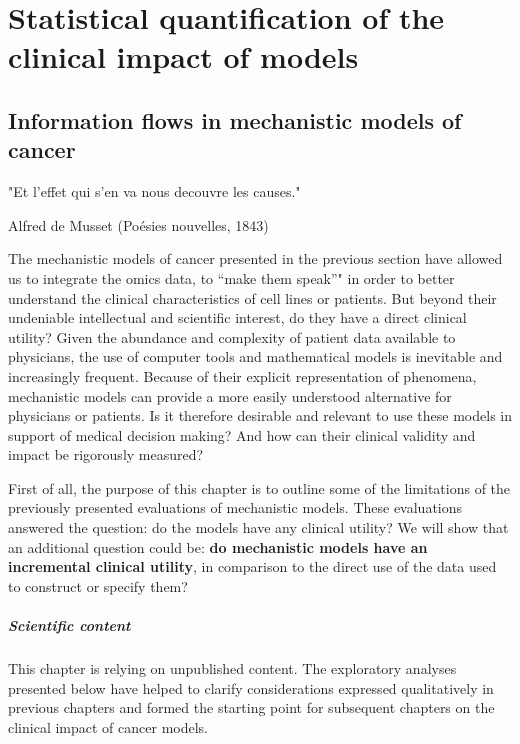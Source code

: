 \documentclass[a4paper,12pt,twoside,onecolumn,openright,final,oldfontcommands]{memoir}
\newcommand{\initial}[1]{
	\lettrine[lines=3,lhang=0.33,nindent=0em]{
		\color{gray}
     		{\textsc{#1}}}{}}
\let\BeginKnitrBlock\begin \let\EndKnitrBlock\end
\begin{document}
\part{Statistical quantification of the clinical impact of
models}\label{part-statistical-quantification-of-the-clinical-impact-of-models}

\chapter{Information flows in mechanistic models of
cancer}\label{information-flows-in-mechanistic-models-of-cancer}

\epigraph{"Et l'effet qui s'en va nous decouvre les causes."}{Alfred de Musset (Poésies nouvelles, 1843)}

\initial{T}he mechanistic models of cancer presented in the previous
section have allowed us to integrate the omics data, to ``make them
speak''" in order to better understand the clinical characteristics of
cell lines or patients. But beyond their undeniable intellectual and
scientific interest, do they have a direct clinical utility? Given the
abundance and complexity of patient data available to physicians, the
use of computer tools and mathematical models is inevitable and
increasingly frequent. Because of their explicit representation of
phenomena, mechanistic models can provide a more easily understood
alternative for physicians or patients. Is it therefore desirable and
relevant to use these models in support of medical decision making? And
how can their clinical validity and impact be rigorously measured?

First of all, the purpose of this chapter is to outline some of the
limitations of the previously presented evaluations of mechanistic
models. These evaluations answered the question: do the models have any
clinical utility? We will show that an additional question could be:
\textbf{do mechanistic models have an incremental clinical utility}, in
comparison to the direct use of the data used to construct or specify
them?

\BeginKnitrBlock{summarybox}
\subsubsection*{Scientific content}\label{scientific-content-4}

This chapter is relying on unpublished content. The exploratory analyses
presented below have helped to clarify considerations expressed
qualitatively in previous chapters and formed the starting point for
subsequent chapters on the clinical impact of cancer models.
\EndKnitrBlock{summarybox}
\end{document}
